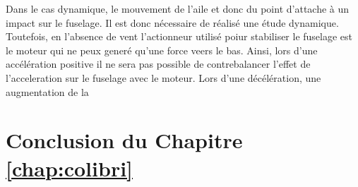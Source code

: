     Dans le cas dynamique, le mouvement de l'aile et donc du point d'attache à un impact sur le fuselage. Il est donc nécessaire de réalisé une étude dynamique. Toutefois, en l'absence de vent l'actionneur utilisé poiur stabiliser le fuselage est le moteur qui ne peux generé qu'une force veers le bas. Ainsi, lors d'une accélération positive il ne sera pas possible de contrebalancer l'effet de l'acceleration sur le fuselage avec le moteur. Lors d'une décélération, une augmentation de la 




\section{Conclusion du Chapitre \ref{chap:colibri}}






